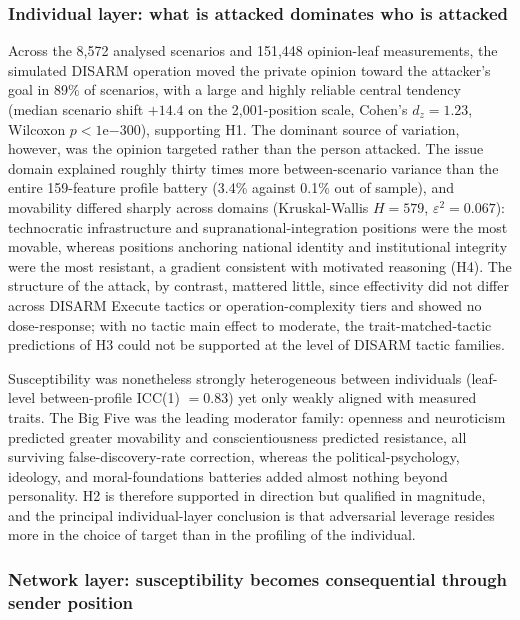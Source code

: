 \documentclass[11pt,a4paper]{article}
\begin{document}
\subsubsection{Individual layer: what is attacked dominates who is attacked}

Across the 8,572 analysed scenarios and 151,448 opinion-leaf measurements, the simulated DISARM
operation moved the private opinion toward the attacker's goal in 89\% of scenarios, with a large
and highly reliable central tendency (median scenario shift $+14.4$ on the 2,001-position scale,
Cohen's $d_z = 1.23$, Wilcoxon $p < 1\mathrm{e}{-300}$), supporting H1. The dominant source of
variation, however, was the opinion targeted rather than the person attacked. The issue domain
explained roughly thirty times more between-scenario variance than the entire 159-feature profile
battery (3.4\% against 0.1\% out of sample), and movability differed sharply across domains
(Kruskal-Wallis $H = 579$, $\varepsilon^2 = 0.067$): technocratic infrastructure and
supranational-integration positions were the most movable, whereas positions anchoring national
identity and institutional integrity were the most resistant, a gradient consistent with motivated
reasoning (H4). The structure of the attack, by contrast, mattered little, since effectivity did
not differ across DISARM Execute tactics or operation-complexity tiers and showed no dose-response;
with no tactic main effect to moderate, the trait-matched-tactic predictions of H3 could not be
supported at the level of DISARM tactic families.

Susceptibility was nonetheless strongly heterogeneous between individuals (leaf-level between-profile
ICC(1) $= 0.83$) yet only weakly aligned with measured traits. The Big Five was the leading
moderator family: openness and neuroticism predicted greater movability and conscientiousness
predicted resistance, all surviving false-discovery-rate correction, whereas the
political-psychology, ideology, and moral-foundations batteries added almost nothing beyond
personality. H2 is therefore supported in direction but qualified in magnitude, and the principal
individual-layer conclusion is that adversarial leverage resides more in the choice of target than
in the profiling of the individual.

\subsubsection{Network layer: susceptibility becomes consequential through sender position}
\end{document}

